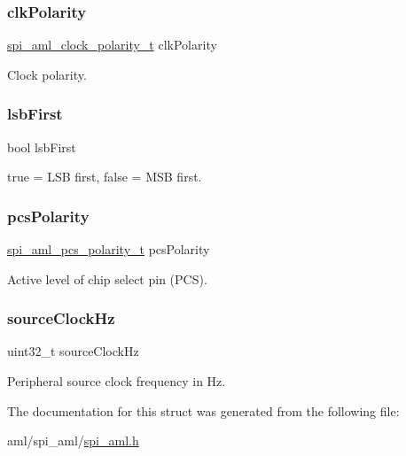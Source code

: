 \subsubsection{\texorpdfstring{clkPolarity}{clkPolarity}}
{\footnotesize\ttfamily \mbox{\hyperlink{group__enum__group_ga846bf859b73b0a584889013e680bdc5f}{spi\+\_\+aml\+\_\+clock\+\_\+polarity\+\_\+t}} clk\+Polarity}

Clock polarity. \mbox{\label{structspi__aml__master__config__t_af684ebd7127978006da4f66fd4b1bf9a}} 
\subsubsection{\texorpdfstring{lsbFirst}{lsbFirst}}
{\footnotesize\ttfamily bool lsb\+First}

true = L\+SB first, false = M\+SB first. \mbox{\label{structspi__aml__master__config__t_a5ab3ca2262578bfbad4d009e8c12d416}} 
\subsubsection{\texorpdfstring{pcsPolarity}{pcsPolarity}}
{\footnotesize\ttfamily \mbox{\hyperlink{group__enum__group_ga376ab165389ceb9a6e3f763263ff7e06}{spi\+\_\+aml\+\_\+pcs\+\_\+polarity\+\_\+t}} pcs\+Polarity}

Active level of chip select pin (P\+CS). \mbox{\label{structspi__aml__master__config__t_a47e9c4d5c767c92424f3d50187d3514b}} 
\subsubsection{\texorpdfstring{sourceClockHz}{sourceClockHz}}
{\footnotesize\ttfamily uint32\+\_\+t source\+Clock\+Hz}

Peripheral source clock frequency in Hz. 

The documentation for this struct was generated from the following file\+:\begin{DoxyCompactItemize}
\item 
aml/spi\+\_\+aml/\mbox{\hyperlink{spi__aml_8h}{spi\+\_\+aml.\+h}}\end{DoxyCompactItemize}
